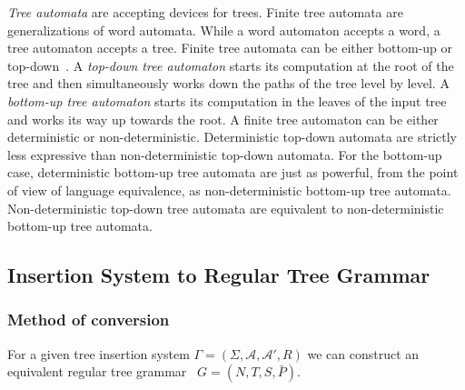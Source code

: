 \emph{Tree automata} are accepting devices for trees.
Finite tree automata are generalizations of word automata. While a word automaton accepts
a word, a tree automaton accepts a tree.
Finite tree automata can be either bottom-up or top-down~\cite{hubert}. A \emph{top-down tree automaton} starts its computation at
the root of the tree and then simultaneously works down the paths of the tree level by level.
A \emph{bottom-up tree automaton}
starts its computation in the leaves of the input tree and works its way up towards the root.
A finite tree automaton can be either deterministic or non-deterministic. 
Deterministic top-down automata are strictly less expressive than non-deterministic
top-down automata. For the bottom-up case, deterministic bottom-up tree automata are just
as powerful, from the point of view of language equivalence, as non-deterministic bottom-up
tree automata. Non-deterministic top-down tree automata are equivalent to non-deterministic
bottom-up tree automata.
\subsection{Insertion System to Regular Tree Grammar}
\subsubsection{Method of conversion}
For a given tree insertion system $\Gamma=(\Sigma,\mathcal{A} ,\mathcal{A} ',R)$ we can construct an equivalent regular tree grammar 
\hbox{ $G=(N,T,S,\bar{P})$}.

